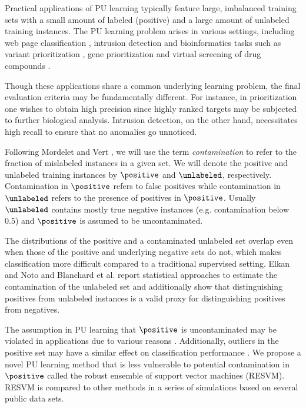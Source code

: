 Practical applications of PU learning typically feature large, imbalanced training sets with a small amount of labeled (positive) and a large amount of unlabeled training instances. The PU learning problem arises in various settings, including web page classification \citep{Yu02pebl:positive}, intrusion detection \citep{Lazarevic03acomparative} and bioinformatics tasks such as variant prioritization \citep{sifrim2013extasy}, gene prioritization \citep{citeulike:615632, mordelet2011prodige} and virtual screening of drug compounds \citep{citeulike:3911}. 

Though these applications share a common underlying learning problem, the final evaluation criteria may be fundamentally different. For instance, in  prioritization one wishes to obtain high precision since highly ranked targets may be subjected to further biological analysis. Intrusion detection, on the other hand, necessitates high recall to ensure that no anomalies go unnoticed.


Following Mordelet and Vert \citep{mordelet2014bagging}, we will use the term \emph{contamination} to refer to the fraction of mislabeled instances in a given set. We will denote the positive and unlabeled training instances by $\positive$ and $\unlabeled$, respectively. Contamination in $\positive$ refers to false positives while contamination in $\unlabeled$ refers to the presence of positives in $\positive$. Usually $\unlabeled$ contains mostly true negative instances (e.g. contamination below $0.5$) and $\positive$ is assumed to be uncontaminated. 

The distributions of the positive and a contaminated unlabeled set overlap even when those of the positive and underlying negative sets do not, which makes classification more difficult compared to a traditional supervised setting. Elkan and Noto \citep{Elkan:2008:LCO:1401890.1401920} and Blanchard et al. \citep{blanchard2010semi} report statistical approaches to estimate the contamination of the unlabeled set and additionally show that distinguishing positives from unlabeled instances is a valid proxy for distinguishing positives from negatives.


The assumption in PU learning that $\positive$ is uncontaminated may be violated in applications due to various reasons \citep{frenay}. Additionally, outliers in the positive set may have a similar effect on classification performance \citep{pechenizkiy2006class}. We propose a novel PU learning method that is less vulnerable to potential contamination in $\positive$ called the robust ensemble of support vector machines (RESVM). RESVM is compared to other methods in a series of simulations based on several public data sets.

